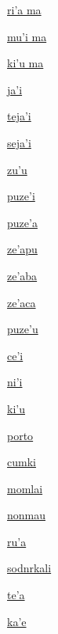 {\hyperlink{val:riha ma}{ri'a ma}}{}{}{}

{\hyperlink{val:muhi ma}{mu'i ma}}{}{}{}

{\hyperlink{val:kihu ma}{ki'u ma}}{}{}{}

{\hyperlink{val:jahi}{ja'i}}{}{}{}

{\hyperlink{val:tejahi}{teja'i}}{}{}{}

{\hyperlink{val:sejahi}{seja'i}}{}{}{}

{\hyperlink{val:zuhu}{zu'u}}{}{}{}

{\hyperlink{val:puzehi}{puze'i}}{}{}{}

{\hyperlink{val:puzeha}{puze'a}}{}{}{}

{\hyperlink{val:zehapu}{ze'apu}}{}{}{}

{\hyperlink{val:zehaba}{ze'aba}}{}{}{}

{\hyperlink{val:zehaca}{ze'aca}}{}{}{}

{\hyperlink{val:puzehu}{puze'u}}{}{}{}

{\hyperlink{val:cehi}{ce'i}}{}{}{}

{\hyperlink{val:nihi}{ni'i}}{}{}{}

{\hyperlink{val:kihu}{ki'u}}{}{}{}

{\hyperlink{val:porto}{porto}}{}{}{}

{\hyperlink{val:cumki}{cumki}}{}{}{}

{\hyperlink{val:momlai}{momlai}}{}{}{}

{\hyperlink{val:nonmau}{nonmau}}{}{}{}

{\hyperlink{val:ruha}{ru'a}}{}{}{}

{\hyperlink{val:sodnrkali}{sodnrkali}}{}{}{}

{\hyperlink{val:teha}{te'a}}{}{}{}

{\hyperlink{val:kahe}{ka'e}}{}{}{}

